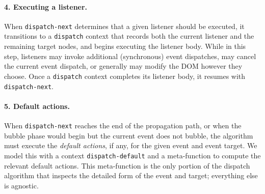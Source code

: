\documentclass[letterpaper,10pt,twocolumn]{article}
\newcommand{\quot}{\mbox{\tt\char'042}}
\newcommand{\wild}{\mbox{\tt\char'137}}
\newcommand{\impl}[1]{{\def\_{\wild}\def\"{\quot}\tt#1}}
\begin{document}
\paragraph{4. Executing a listener.}  When \impl{dispatch-next}
determines that a given listener should be executed, it transitions to
a \impl{dispatch} context that records both the current listener and
the remaining target nodes, and begins executing the listener body.
While in this step, listeners may invoke additional (synchronous)
event dispatches, may cancel the current event dispatch, or generally
may modify the DOM however they choose.  Once a \impl{dispatch}
context completes its listener body, it resumes with \impl{dispatch-next}.

\paragraph{5. Default actions.}  When \impl{dispatch-next} reaches the
end of the propagation path, or when the bubble phase would begin but
the current event does not bubble, the algorithm must execute the
\emph{default actions}, if any, for the given event and event target.
We model this with a context \impl{dispatch-default} and a
meta-function to compute the relevant default actions.  This
meta-function is the only portion of the dispatch algorithm that
inspects the detailed form of the event and target; everything else is
agnostic.
\end{document}
